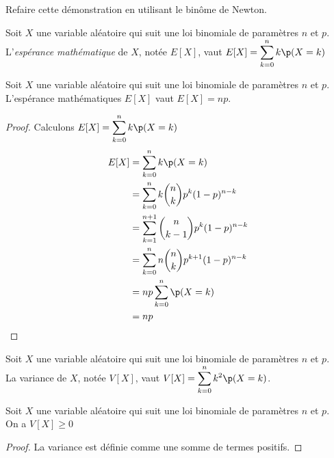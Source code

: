 \documentclass[12pt,a4paper,french]{article}
\begin{document}
\begin{question}
  Refaire cette démonstration en utilisant le binôme de Newton.
\end{question}

\begin{definition}
  Soit $X$ une variable aléatoire qui suit une loi binomiale de paramètres
  $n$ et $p$.\\
  L'\emph{espérance mathématique} de $X$, notée $E[X]$, vaut $E[X] =
  \displaystyle\sum_{k= 0}^nk\p(X = k)$
\end{definition}

\begin{proposition}
  Soit $X$ une variable aléatoire qui suit une loi binomiale de paramètres
  $n$ et $p$.\\
  L'espérance mathématiques $E[X]$ vaut $E[X] = np$.
\end{proposition}
\begin{proof}
  Calculons $E[X] = \displaystyle\sum_{k= 0}^nk\p(X = k)$
  \begin{align*}
    E[X] & = \sum_{k= 0}^nk\p(X = k)                        \\
         & = \sum_{k=0}^n k\binom{n}{k}p^k(1-p)^{n-k}       \\
         & = \sum_{k=1}^{n+1} \binom{n}{k-1} p^k(1-p)^{n-k} \\
         & = \sum_{k=0}^n n \binom{n}{k} p^{k+1}(1-p)^{n-k} \\
         & = np \sum_{k=0}^n \p(X = k)                      \\
         & = np
  \end{align*}
\end{proof}

\begin{definition}
  Soit $X$ une variable aléatoire qui suit une loi binomiale de paramètres
  $n$ et $p$.\\
  La variance de $X$, notée $V[X]$, vaut $V[X] = \displaystyle\sum_{k= 0}^n
  k^2 \p(X = k)$.
\end{definition}

\begin{proposition}
  Soit $X$ une variable aléatoire qui suit une loi binomiale de paramètres
  $n$ et $p$.\\
  On a $V[X] ≥ 0$
\end{proposition}
\begin{proof}
  La variance est définie comme une somme de termes positifs.
\end{proof}
\end{document}
